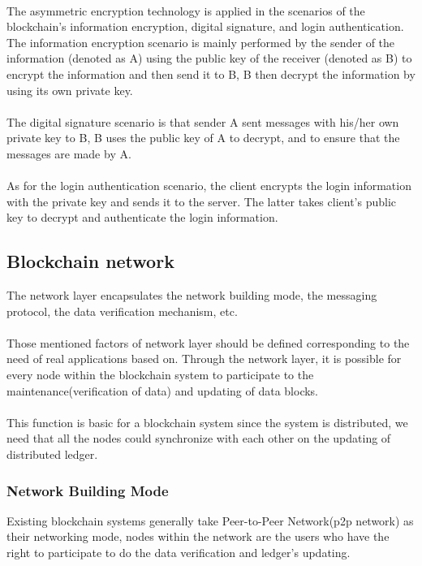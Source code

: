 \documentclass[doublespacing]{bmcart}
\begin{document}
\begin{CJK*}{UTF8}{gbsn}
\paragraph{} The asymmetric encryption technology is applied in the scenarios of the blockchain's information encryption, digital signature, and login authentication. The information encryption scenario is mainly performed by the sender of the information (denoted as A) using the public key of the receiver (denoted as B) to encrypt the information and then send it to B, B  then decrypt the information by using its own private key. 
\paragraph{} The digital signature scenario is that sender A sent messages with his/her own private key to B, B uses the public key of A to decrypt, and to ensure that the messages are made by A. 
\paragraph{} As for the login authentication scenario, the client encrypts the login information with the private key and sends it to the server. The latter takes client's public key to decrypt and authenticate the login information.
\subsection{Blockchain network}	
The network layer encapsulates the network building mode, the messaging protocol, the data verification mechanism, etc. 
\paragraph{} Those mentioned factors of network layer should be defined corresponding to the need of real applications based on. Through the network layer, it is possible for every node within the blockchain system to participate to the maintenance(verification of data) and updating of data blocks. 
\paragraph{} This function is basic for a blockchain system since the system is distributed, we need that all the nodes could synchronize with each other on the updating of distributed ledger.
\subsubsection*{Network Building Mode}
Existing blockchain systems generally take Peer-to-Peer Network(p2p network) as their networking mode, nodes within the network are the users who have the right to participate to do the data verification and ledger's updating.

\end{CJK*}
\end{document}
